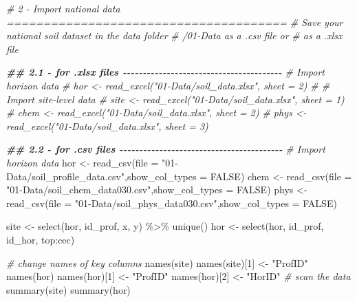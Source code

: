 \documentclass[
  10pt,
  b5paper,
  oneside]{book}
\newenvironment{Shaded}{\begin{snugshade}}{\end{snugshade}}
\newcommand{\AttributeTok}[1]{\textcolor[rgb]{0.77,0.63,0.00}{#1}}
\newcommand{\CommentTok}[1]{\textcolor[rgb]{0.56,0.35,0.01}{\textit{#1}}}
\newcommand{\ConstantTok}[1]{\textcolor[rgb]{0.00,0.00,0.00}{#1}}
\newcommand{\DecValTok}[1]{\textcolor[rgb]{0.00,0.00,0.81}{#1}}
\newcommand{\DocumentationTok}[1]{\textcolor[rgb]{0.56,0.35,0.01}{\textbf{\textit{#1}}}}
\newcommand{\FunctionTok}[1]{\textcolor[rgb]{0.00,0.00,0.00}{#1}}
\newcommand{\NormalTok}[1]{#1}
\newcommand{\OtherTok}[1]{\textcolor[rgb]{0.56,0.35,0.01}{#1}}
\newcommand{\SpecialCharTok}[1]{\textcolor[rgb]{0.00,0.00,0.00}{#1}}
\newcommand{\StringTok}[1]{\textcolor[rgb]{0.31,0.60,0.02}{#1}}
\begin{document}
\begin{Shaded}
\begin{Highlighting}[]
\CommentTok{\# 2 {-} Import national data ======================================}
\CommentTok{\# Save your national soil dataset in the data folder }
\CommentTok{\# /01{-}Data as a .csv file or }
\CommentTok{\# as a .xlsx file}

\DocumentationTok{\#\# 2.1 {-} for .xlsx files {-}{-}{-}{-}{-}{-}{-}{-}{-}{-}{-}{-}{-}{-}{-}{-}{-}{-}{-}{-}{-}{-}{-}{-}{-}{-}{-}{-}{-}{-}{-}{-}{-}{-}{-}{-}{-}{-}{-}{-}}
\CommentTok{\# Import horizon data }
\CommentTok{\# hor \textless{}{-} read\_excel("01{-}Data/soil\_data.xlsx", sheet = 2)}
\CommentTok{\# \# Import site{-}level data}
\CommentTok{\# site \textless{}{-} read\_excel("01{-}Data/soil\_data.xlsx", sheet = 1)}
\CommentTok{\# chem \textless{}{-} read\_excel("01{-}Data/soil\_data.xlsx", sheet = 2)}
\CommentTok{\# phys \textless{}{-} read\_excel("01{-}Data/soil\_data.xlsx", sheet = 3)}


\DocumentationTok{\#\# 2.2 {-} for .csv files {-}{-}{-}{-}{-}{-}{-}{-}{-}{-}{-}{-}{-}{-}{-}{-}{-}{-}{-}{-}{-}{-}{-}{-}{-}{-}{-}{-}{-}{-}{-}{-}{-}{-}{-}{-}{-}{-}{-}{-}{-}}
\CommentTok{\# Import horizon data }
\NormalTok{hor }\OtherTok{\textless{}{-}} 
  \FunctionTok{read\_csv}\NormalTok{(}\AttributeTok{file =} 
          \StringTok{"01{-}Data/soil\_profile\_data.csv"}\NormalTok{,}\AttributeTok{show\_col\_types =} \ConstantTok{FALSE}\NormalTok{)}
\NormalTok{chem }\OtherTok{\textless{}{-}} 
  \FunctionTok{read\_csv}\NormalTok{(}\AttributeTok{file =} 
          \StringTok{"01{-}Data/soil\_chem\_data030.csv"}\NormalTok{,}\AttributeTok{show\_col\_types =} \ConstantTok{FALSE}\NormalTok{)}
\NormalTok{phys }\OtherTok{\textless{}{-}} \FunctionTok{read\_csv}\NormalTok{(}\AttributeTok{file =} 
          \StringTok{"01{-}Data/soil\_phys\_data030.csv"}\NormalTok{,}\AttributeTok{show\_col\_types =} \ConstantTok{FALSE}\NormalTok{)}


\NormalTok{site }\OtherTok{\textless{}{-}} \FunctionTok{select}\NormalTok{(hor, id\_prof, x, y) }\SpecialCharTok{\%\textgreater{}\%} \FunctionTok{unique}\NormalTok{()}
\NormalTok{hor }\OtherTok{\textless{}{-}} \FunctionTok{select}\NormalTok{(hor, id\_prof, id\_hor, top}\SpecialCharTok{:}\NormalTok{cec)}

\CommentTok{\# change names of key columns}
\FunctionTok{names}\NormalTok{(site)}
\FunctionTok{names}\NormalTok{(site)[}\DecValTok{1}\NormalTok{] }\OtherTok{\textless{}{-}} \StringTok{"ProfID"}
\FunctionTok{names}\NormalTok{(hor)}
\FunctionTok{names}\NormalTok{(hor)[}\DecValTok{1}\NormalTok{] }\OtherTok{\textless{}{-}} \StringTok{"ProfID"}
\FunctionTok{names}\NormalTok{(hor)[}\DecValTok{2}\NormalTok{] }\OtherTok{\textless{}{-}} \StringTok{"HorID"}
\CommentTok{\# scan the data}
\FunctionTok{summary}\NormalTok{(site)}
\FunctionTok{summary}\NormalTok{(hor)}


\end{Highlighting}
\end{Shaded}
\end{document}
